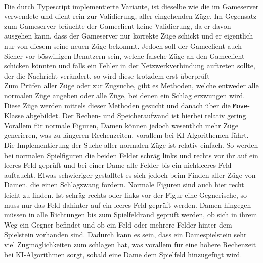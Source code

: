 \documentclass[12pt,a4paper,bibliography=totocnumbered,listof=totocnumbered]{article}
\begin{document}
\\
Die durch Typescript implementierte Variante, ist dieselbe wie die im Gameserver verwendete und dient rein zur Validierung, aller eingehenden Züge. Im Gegensatz zum Gameserver 
bräuchte der Gameclient keine Validierung, da er davon ausgehen kann, dass der Gameserver nur korrekte Züge schickt und er eigentlich nur von diesem seine 
neuen Züge bekommt. Jedoch soll der Gameclient auch Sicher vor böswilligen Benutzern sein, welche falsche Züge an den Gameclient schicken könnten und falls ein Fehler 
in der Netzwerkverbindung auftreten sollte, der die Nachricht verändert, so wird diese trotzdem erst überprüft
\\
Zum Prüfen aller Züge oder zur Zugsuche, gibt es Methoden, welche entweder alle normalen Züge angeben oder alle Züge, bei denen ein Schlag erzwungen wird. 
Diese Züge werden mittels dieser Methoden gesucht und danach über die \texttt{Move}-Klasse abgebildet. Der Rechen- und Speicheraufwand ist hierbei relativ gering.
Vorallem für normale Figuren, Damen können jedoch wesentlich mehr Züge generieren, was zu längeren Rechenzeiten, vorallem bei KI-Algorithemen führt.
\\
Die Implementierung der Suche aller normalen Züge ist relativ einfach. So werden bei normalen Spielfiguren die beiden Felder schräg links und rechts vor ihr 
auf ein leeres Feld geprüft und bei einer Dame alle Felder bis ein nichtleeres Feld auftaucht. Etwas schwieriger gestalltet es sich jedoch beim Finden aller 
Züge von Damen, die einen Schlagzwang fordern. Normale Figuren sind auch hier recht leicht zu finden. Ist schräg rechts oder links vor der Figur 
eine Gegnerische, so muss nur das Feld dahinter auf ein leeres Feld geprüft werden. Damen hingegen müssen in alle Richtungen bis zum Spielfeldrand 
geprüft werden, ob sich in ihrem Weg ein Gegner befindet und ob ein Feld oder mehrere Felder hinter dem Spielstein vorhanden sind. Dadurch kann es sein, dass ein 
Damespielstein sehr viel Zugmöglichkeiten zum schlagen hat, was vorallem für eine höhere Rechenzeit bei KI-Algorithmen sorgt, sobald eine Dame dem Spielfeld hinzugefügt wird.
\end{document}

